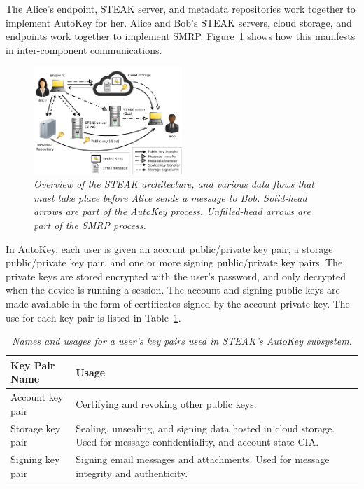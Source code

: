The Alice’s endpoint, STEAK server, and metadata repositories work together to implement AutoKey for her.  Alice and Bob’s STEAK servers, cloud storage, and endpoints work together to implement SMRP.  Figure~\ref{fig:overview} shows how this manifests in inter-component communications.

\begin{figure}[h!]
\centering
\includegraphics[width=0.5\textwidth]{figures/overview}
\caption{\it Overview of the STEAK architecture, and various data flows that must take place before Alice sends a message to Bob.  Solid-head arrows are part of the AutoKey process.  Unfilled-head arrows are part of the SMRP process.}
\label{fig:overview}
\end{figure}


In AutoKey, each user is given an account public/private key pair, a storage public/private key pair, and one or more signing public/private key pairs.  The private keys are stored encrypted with the user’s password, and only decrypted when the device is running a session.  The account and signing public keys are made available in the form of certificates signed by the account private key.  The use for each key pair is listed in Table~\ref{tab:keypairs}.

\begin{table}[ht!]
\begin{tabular}{ | l | l |}
\hline
\textbf{Key Pair Name} & \textbf{Usage} \\
\hline
Account key pair & Certifying and revoking other public keys. \\
Storage key pair & Sealing, unsealing, and signing data hosted in cloud storage.  Used for message confidentiality, and account state CIA. \\
Signing key pair & Signing email messages and attachments.  Used for message integrity and authenticity. \\
\hline
\end{tabular}
\caption{\it Names and usages for a user’s key pairs used in STEAK’s AutoKey subsystem.}
\label{tab:keypairs}
\end{table}


